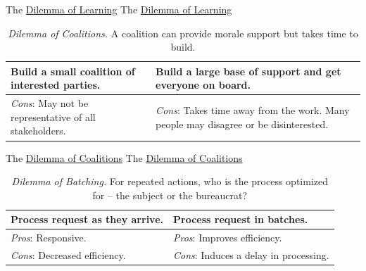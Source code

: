 The \href{table:lessons_learned_source}{Dilemma of Learning}
The \href{table:lessons_learned_source}{Dilemma of Learning}


\begin{center}
\begin{table}[H] %
\begin{tabular}{ | m{\dilemmatablewidth}| m{\dilemmatablewidth} | } 
  \hline
  \textbf{Build a small coalition of interested parties.} & 
  \textbf{Build a large base of support and get everyone on board.} \\ 
  \hline
  \textit{Cons}: May not be representative of all stakeholders. & 
  \textit{Cons}: Takes time away from the work. Many people may disagree or be disinterested. \\  
  \hline
\end{tabular}
\caption{
\textit{Dilemma of Coalitions.}
A coalition can provide morale support but takes time to build.
}
\label{table:how_to_change}
\end{table}
\end{center}


The \href{table:how_to_change}{Dilemma of Coalitions}
The \href{table:how_to_change}{Dilemma of Coalitions}


\begin{center}
\begin{table}[H] %
\begin{tabular}{ | m{\dilemmatablewidth}| m{\dilemmatablewidth} | } 
  \hline
  \textbf{Process request as they arrive.} &
  \textbf{Process request in batches.} \\
  \hline
  \textit{Pros}: Responsive. & 
  \textit{Pros}: Improves efficiency. \\
  \hline
  \textit{Cons}: Decreased efficiency. & 
  \textit{Cons}: Induces a delay in processing. \\
  \hline
\end{tabular}
\caption{
\textit{Dilemma of Batching.}
For repeated actions, who is the process optimized for -- the subject or the bureaucrat?
}
\label{table:dilemma-of-batching}
\end{table}
\end{center}


